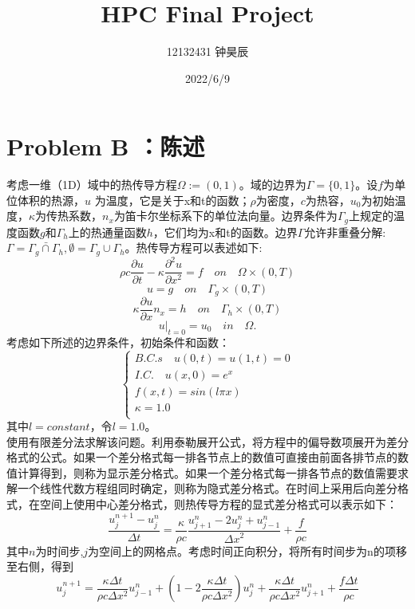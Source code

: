 \documentclass{article}
\title{HPC Final Project}
\author{12132431 钟昊辰}
\date{2022/6/9}
\begin{document}
		\maketitle     %
		
		\tableofcontents   %

		\clearpage
		
		\section{Problem B ：陈述}
		考虑一维（1D）域中的热传导方程$\Omega:=(0,1)$。域的边界为$\Gamma=\{0,1\}$。设$f$为单位体积的热源，$u$ 为温度，它是关于x和t的函数；$\rho$为密度，$c$为热容，$u_0$为初始温度，$\kappa$为传热系数，$n_x$为笛卡尔坐标系下的单位法向量。边界条件为$\Gamma_g$上规定的温度函数$g$和$\Gamma_h$上的热通量函数$h$，它们均为x和t的函数。边界$\Gamma$允许非重叠分解:$ \Gamma = \bar{\Gamma_g \cap \Gamma_h},\emptyset = \Gamma_g \cup \Gamma_h$。热传导方程可以表述如下:
		$$
		\rho c \frac{\partial u}{\partial t}-\kappa\frac{\partial^2 u}{\partial x^2}=f
		\quad on \quad \Omega \times (0,T)
		 $$	
		$$
		u=g
		\quad on \quad \Gamma_g \times (0,T)
		$$
		$$
		\kappa \frac{\partial u}{\partial x}n_x=h
		\quad on \quad \Gamma_h \times (0,T)
		$$
		$$
		u|_{t=0}=u_0
		\quad in \quad \Omega.
		$$
		考虑如下所述的边界条件，初始条件和函数：
		$$ 
		\left\{
		\begin{aligned}
			B.C.s \quad u(0,t)=u(1,t)=0 \\
			I.C. \quad u(x,0)=e^x \\
			f(x,t)=sin(l\pi x) \\
			\kappa=1.0 \\
		\end{aligned}
		\right.
		$$
		其中$l=constant$，令$l=1.0$。\\
		使用有限差分法求解该问题。利用泰勒展开公式，将方程中的偏导数项展开为差分格式的公式。如果一个差分格式每一排各节点上的数值可直接由前面各排节点的数值计算得到，则称为显示差分格式。如果一个差分格式每一排各节点的数值需要求解一个线性代数方程组同时确定，则称为隐式差分格式。在时间上采用后向差分格式，在空间上使用中心差分格式，则热传导方程的显式差分格式可以表示如下：
		$$
		\frac{u^{n+1}_j-u^n_j}{\Delta t}=\frac{\kappa }{\rho  c}\frac{u^{n}_{j+1}-2u^{n}_j+u^{n}_{j-1}}{{\Delta x}^2}+\frac{f}{\rho c}
		$$
		其中$n$为时间步,$j$为空间上的网格点。考虑时间正向积分，将所有时间步为n的项移至右侧，得到
		$$
		u_j^{n+1}=\frac{\kappa \Delta t}{\rho  c \Delta x^2}u^{n}_{j-1}+(1-2\frac{\kappa \Delta t}{\rho  c \Delta x^2})u^{n}_{j}+\frac{\kappa \Delta t}{\rho  c \Delta x^2}u^{n}_{j+1}+\frac{f \Delta t}{\rho c}
		$$
\end{document}
